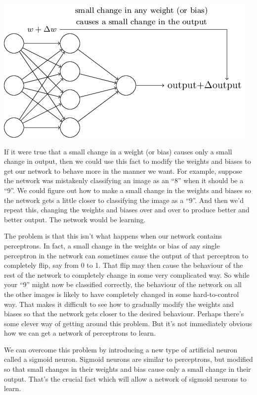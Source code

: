 \documentclass[a4paper,twoside,10pt]{book}
\begin{document}
\begin{center}
	\includegraphics[scale=0.5]{./figures/ch1/tikz8}
\end{center}
If it were true that a small change in a weight (or bias) causes only a small change in output, then we could use this fact to modify the weights and biases to get our network to behave more in the manner we want. For example, suppose the network was mistakenly classifying an image as an ``8'' when it should be a ``9''. We could figure out how to make a small change in the weights and biases so the network gets a little closer to classifying the image as a ``9''. And then we'd repeat this, changing the weights and biases over and over to produce better and better output. The network would be learning.

The problem is that this isn't what happens when our network contains perceptrons. In fact, a small change in the weights or bias of any single perceptron in the network can sometimes cause the output of that perceptron to completely flip, say from 0 to 1. That flip may then cause the behaviour of the rest of the network to completely change in some very complicated way. So while your ``9'' might now be classified correctly, the behaviour of the network on all the other images is likely to have completely changed in some hard-to-control way. That makes it difficult to see how to gradually modify the weights and biases so that the network gets closer to the desired behaviour. Perhaps there's some clever way of getting around this problem. But it's not immediately obvious how we can get a network of perceptrons to learn.

We can overcome this problem by introducing a new type of artificial neuron called a sigmoid neuron. Sigmoid neurons are similar to perceptrons, but modified so that small changes in their weights and bias cause only a small change in their output. That's the crucial fact which will allow a network of sigmoid neurons to learn.
\end{document}
